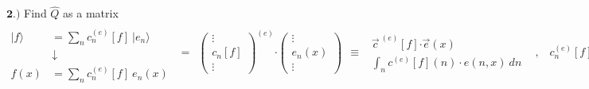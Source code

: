 \documentclass[12pt]{article}
\newcommand*{\dotP}{\boldsymbol \cdot}	%
\newcommand{\hs}{\hspace{1pt}} %
\begin{document}
\vspace{15pt} \noindent
\(\boldsymbol{2.)}\) Find \(\widehat{Q}\) as a matrix\\[5pt]
\( \displaystyle
    \begin{aligned}
        \\[-8pt]
        | f \rangle & = \sum_n c_n^{(e)}{\scriptstyle[f]} \ \big| e_n \big\rangle \\[-8pt]
        & \hs \downarrow \\[-4pt]
        f {\scriptstyle(x)} & = \sum_n c_n^{(e)}{\scriptstyle[f]} \ e_n{\scriptstyle(x)} 
    \end{aligned}
    \ \ = \ \ 
    \left( \begin{matrix} 
        \vdots\\
        c_n{\scriptstyle[f]}\\
        \vdots
    \end{matrix} \right)^{(e)} \dotP
    \left( \begin{matrix} 
        \vdots\\
        e_n{\scriptstyle(x)}\\
        \vdots
    \end{matrix} \right)
    \ \ \equiv \ \
    \boxed{ \begin{gathered}
        \vec{c}^{\ (e)}{\scriptstyle[f]} \dotP \vec{e}{\scriptstyle(x)} \\[5pt]
        \int_n c^{(e)}{\scriptstyle[f]}{\scriptstyle(n)} \cdot e{\scriptstyle(n, x)} \ dn
    \end{gathered} } 
    \hspace{10pt} , \hspace{10pt}
    \boxed{ c_n^{(e)}{\scriptstyle[f]} = \langle e_n | f \rangle }
\)
\end{document}
